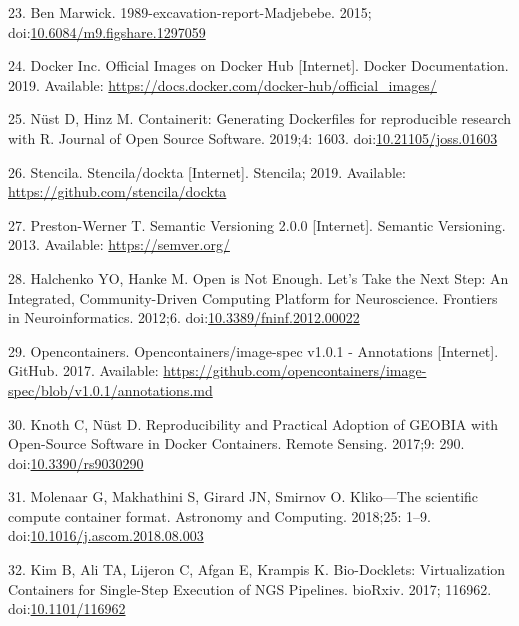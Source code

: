 \documentclass[10pt,letterpaper]{article}
\begin{document}
\leavevmode\hypertarget{ref-marwick_madjebebe_2015}{}%
23. Ben Marwick. 1989-excavation-report-Madjebebe. 2015;
doi:\href{https://doi.org/10.6084/m9.figshare.1297059}{10.6084/m9.figshare.1297059}

\leavevmode\hypertarget{ref-docker_inc_official_2019}{}%
24. Docker Inc. Official Images on Docker Hub {[}Internet{]}. Docker
Documentation. 2019. Available:
\url{https://docs.docker.com/docker-hub/official_images/}

\leavevmode\hypertarget{ref-nust_containerit_2019}{}%
25. Nüst D, Hinz M. Containerit: Generating Dockerfiles for reproducible
research with R. Journal of Open Source Software. 2019;4: 1603.
doi:\href{https://doi.org/10.21105/joss.01603}{10.21105/joss.01603}

\leavevmode\hypertarget{ref-stencila_dockta_2019}{}%
26. Stencila. Stencila/dockta {[}Internet{]}. Stencila; 2019. Available:
\url{https://github.com/stencila/dockta}

\leavevmode\hypertarget{ref-preston-werner_semantic_2013}{}%
27. Preston-Werner T. Semantic Versioning 2.0.0 {[}Internet{]}. Semantic
Versioning. 2013. Available: \url{https://semver.org/}

\leavevmode\hypertarget{ref-halchenko_open_2012}{}%
28. Halchenko YO, Hanke M. Open is Not Enough. Let's Take the Next Step:
An Integrated, Community-Driven Computing Platform for Neuroscience.
Frontiers in Neuroinformatics. 2012;6.
doi:\href{https://doi.org/10.3389/fninf.2012.00022}{10.3389/fninf.2012.00022}

\leavevmode\hypertarget{ref-opencontainers_image-spec_2017}{}%
29. Opencontainers. Opencontainers/image-spec v1.0.1 - Annotations
{[}Internet{]}. GitHub. 2017. Available:
\url{https://github.com/opencontainers/image-spec/blob/v1.0.1/annotations.md}

\leavevmode\hypertarget{ref-knoth_reproducibility_2017}{}%
30. Knoth C, Nüst D. Reproducibility and Practical Adoption of GEOBIA
with Open-Source Software in Docker Containers. Remote Sensing. 2017;9:
290. doi:\href{https://doi.org/10.3390/rs9030290}{10.3390/rs9030290}

\leavevmode\hypertarget{ref-molenaar_klikoscientific_2018}{}%
31. Molenaar G, Makhathini S, Girard JN, Smirnov O. Kliko---The
scientific compute container format. Astronomy and Computing. 2018;25:
1--9.
doi:\href{https://doi.org/10.1016/j.ascom.2018.08.003}{10.1016/j.ascom.2018.08.003}

\leavevmode\hypertarget{ref-kim_bio-docklets_2017}{}%
32. Kim B, Ali TA, Lijeron C, Afgan E, Krampis K. Bio-Docklets:
Virtualization Containers for Single-Step Execution of NGS Pipelines.
bioRxiv. 2017; 116962.
doi:\href{https://doi.org/10.1101/116962}{10.1101/116962}
\end{document}
